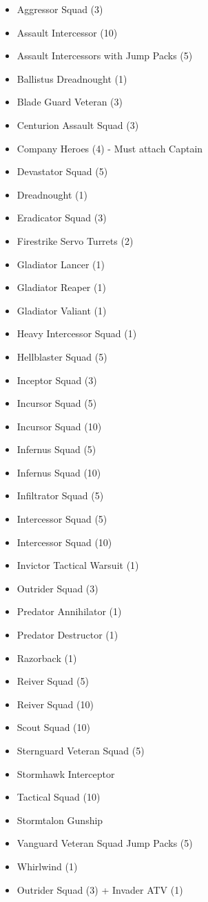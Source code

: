 \documentclass{HordeModeTarot}
\begin{document}
\begin{multicols}{2}
\begin{itemize}[leftmargin=*]
\item[] Aggressor Squad (3)
\item[] Assault Intercessor (10)
\item[] Assault Intercessors with Jump Packs (5)
\item[] Ballistus Dreadnought (1)
\item[] Blade Guard Veteran (3)
\item[] Centurion Assault Squad (3)
\item[] Company Heroes (4) - Must attach Captain
\item[] Devastator Squad (5)
\item[] Dreadnought (1)
\item[] Eradicator Squad (3)
\item[] Firestrike Servo Turrets (2)
\item[] Gladiator Lancer (1)
\item[] Gladiator Reaper (1)
\item[] Gladiator Valiant (1)
\item[] Heavy Intercessor Squad (1)
\item[] Hellblaster Squad (5)
\item[] Inceptor Squad (3)
\item[] Incursor Squad (5)
\item[] Incursor Squad (10)
\item[] Infernus Squad (5)
\item[] Infernus Squad (10)
\item[] Infiltrator Squad (5)
\item[] Intercessor Squad (5)
\item[] Intercessor Squad (10)
\item[] Invictor Tactical Warsuit (1)
\item[] Outrider Squad (3)
\item[] Predator Annihilator (1)
\item[] Predator Destructor (1)
\item[] Razorback (1)
\item[] Reiver Squad (5)
\item[] Reiver Squad (10)
\item[] Scout Squad (10)
\item[] Sternguard Veteran Squad (5)
\item[] Stormhawk Interceptor
\item[] Tactical Squad (10)
\item[] Stormtalon Gunship
\item[] Vanguard Veteran Squad Jump Packs (5)
\item[] Whirlwind (1)
\item[] Outrider Squad (3) + Invader ATV (1)
\end{itemize}


\end{multicols}
\end{document}
